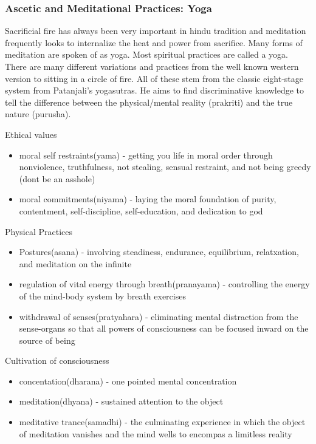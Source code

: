 \documentclass{article}
\begin{document}
\subsubsection{Ascetic and Meditational Practices: Yoga}
\label{ssub:ascetic_and_meditational_practices_yoga}
Sacrificial fire has always been very important in hindu tradition and meditation frequently looks to internalize the heat and power from sacrifice. Many forms of meditation are spoken of as yoga. Most spiritual practices are called a yoga. There are many different variations and practices from the well known western version to sitting in a circle of fire. All of these stem from the classic eight-stage system from Patanjali's yogasutras. He aims to find discriminative knowledge to tell the difference between the physical/mental reality (prakriti) and the true nature (purusha).

Ethical values
\begin{itemize}
	\item moral self restraints(yama) - getting you life in moral order through nonviolence, truthfulness, not stealing, sensual restraint, and not being greedy (dont be an asshole)
	\item moral commitments(niyama) - laying the moral foundation of purity, contentment, self-discipline, self-education, and dedication to god
\end{itemize}

Physical Practices
\begin{itemize}
	\item Postures(asana) - involving steadiness, endurance, equilibrium, relatxation, and meditation on the infinite
	\item regulation of vital energy through breath(pranayama) - controlling the energy of the mind-body system by breath exercises
	\item withdrawal of senses(pratyahara) -  eliminating mental distraction from the sense-organs so that all powers of consciousness can be focused inward on the source of being
\end{itemize}

Cultivation of consciousness
\begin{itemize}
	\item concentation(dharana) - one pointed mental concentration
	\item meditation(dhyana) - sustained attention to the object
	\item meditative trance(samadhi) - the culminating experience in which the object of meditation vanishes and the mind wells to encompas a limitless reality
\end{itemize}
\end{document}
